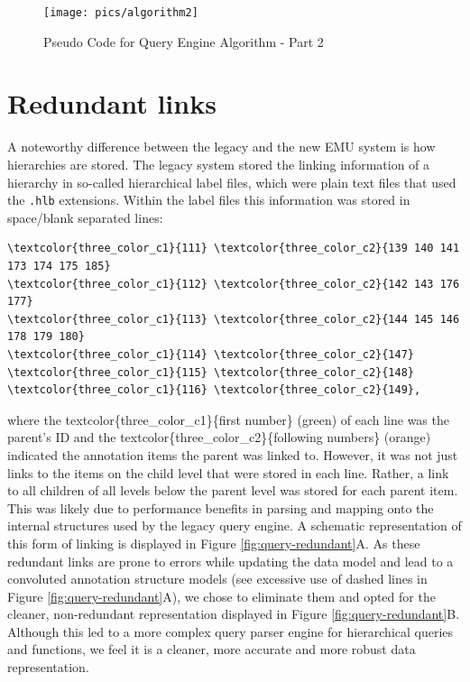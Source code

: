 \documentclass[]{book}
\begin{document}
\begin{figure}

{\centering \texttt{[image: pics/algorithm2]} 

}

\caption{Pseudo Code for Query Engine Algorithm - Part 2}\label{fig:query-implQueryEnginePC-p2}
\end{figure}

\hypertarget{subsec:query-redundantLinks}{%
\section{Redundant links}\label{subsec:query-redundantLinks}}

A noteworthy difference between the legacy and the new EMU system is how hierarchies are stored. The legacy system stored the linking information of a hierarchy in so-called hierarchical label files, which were plain text files that used the \texttt{.hlb} extensions. Within the label files this information was stored in space/blank separated lines:

\begin{verbatim}
\textcolor{three_color_c1}{111} \textcolor{three_color_c2}{139 140 141 173 174 175 185}
\textcolor{three_color_c1}{112} \textcolor{three_color_c2}{142 143 176 177}
\textcolor{three_color_c1}{113} \textcolor{three_color_c2}{144 145 146 178 179 180}
\textcolor{three_color_c1}{114} \textcolor{three_color_c2}{147}
\textcolor{three_color_c1}{115} \textcolor{three_color_c2}{148}
\textcolor{three_color_c1}{116} \textcolor{three_color_c2}{149},
\end{verbatim}

where the textcolor\{three\_color\_c1\}\{first number\} (green) of each line was the parent's ID and the textcolor\{three\_color\_c2\}\{following numbers\} (orange) indicated the annotation items the parent was linked to. However, it was not just links to the items on the child level that were stored in each line. Rather, a link to all children of all levels below the parent level was stored for each parent item. This was likely due to performance benefits in parsing and mapping onto the internal structures used by the legacy query engine. A schematic representation of this form of linking is displayed in Figure \ref{fig:query-redundant}A. As these redundant links are prone to errors while updating the data model and lead to a convoluted annotation structure models (see excessive use of dashed lines in Figure \ref{fig:query-redundant}A), we chose to eliminate them and opted for the cleaner, non-redundant representation displayed in Figure \ref{fig:query-redundant}B. Although this led to a more complex query parser engine for hierarchical queries and functions, we feel it is a cleaner, more accurate and more robust data representation.
\end{document}
